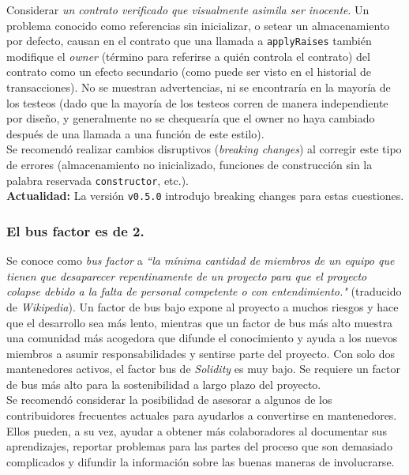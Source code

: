 Considerar \textit{un contrato verificado que visualmente asimila ser inocente}\cite{EtherscanRopstenContratoMalicioso}. Un problema conocido como referencias sin inicializar, o setear un almacenamiento por defecto, causan en el contrato que una llamada a \verb|applyRaises| también modifique el \textit{owner} (término para referirse a quién controla el contrato) del contrato como un efecto secundario (como puede ser visto en el historial de transacciones). No se muestran advertencias, ni se encontraría en la mayoría de los testeos (dado que la mayoría de los testeos corren de manera independiente por diseño, y generalmente no se chequearía que el owner no haya cambiado después de una llamada a una función de este estilo).\\

Se recomendó realizar cambios disruptivos (\textit{breaking changes}) al corregir este tipo de errores (almacenamiento no inicializado, funciones de construcción sin la palabra reservada \verb|constructor|, etc.).\\

\textbf{Actualidad:} La versión \texttt{v0.5.0} introdujo breaking changes para estas cuestiones.

\subsubsection{El bus factor es de 2.}
Se conoce como \textit{bus factor} a \textit{``la mínima cantidad de miembros de un equipo que tienen que desaparecer repentinamente de un proyecto para que el proyecto colapse debido a la falta de personal competente o con entendimiento."} (traducido de \textit{Wikipedia}\cite{WikiBusFactor}). Un factor de bus bajo expone al proyecto a muchos riesgos y hace que el desarrollo sea más lento, mientras que un factor de bus más alto muestra una comunidad más acogedora que difunde el conocimiento y ayuda a los nuevos miembros a asumir responsabilidades y sentirse parte del proyecto. Con solo dos mantenedores activos\cite{GHContributors}, el factor bus de \textit{Solidity} es muy bajo. Se requiere un factor de bus más alto para la sostenibilidad a largo plazo del proyecto.\\

Se recomendó considerar la posibilidad de asesorar a algunos de los contribuidores frecuentes actuales para ayudarlos a convertirse en mantenedores. Ellos pueden, a su vez, ayudar a obtener más colaboradores al documentar sus aprendizajes, reportar problemas para las partes del proceso que son demasiado complicados y difundir la información sobre las buenas maneras de involucrarse.\\

